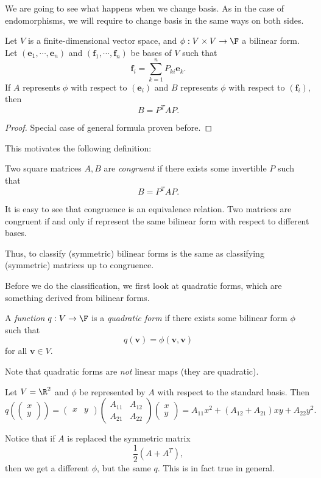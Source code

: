 \documentclass[a4paper]{article}
\begin{document}
We are going to see what happens when we change basis. As in the case of endomorphisms, we will require to change basis in the same ways on both sides.

\begin{lemma}
  Let $V$ is a finite-dimensional vector space, and $\phi: V\times V \to \F$ a bilinear form. Let $(\mathbf{e}_1, \cdots, \mathbf{e}_n)$ and $(\mathbf{f}_1, \cdots, \mathbf{f}_n)$ be bases of $V$ such that
  \[
    \mathbf{f}_i = \sum_{k = 1}^n P_{ki} \mathbf{e}_k.
  \]
  If $A$ represents $\phi$ with respect to $(\mathbf{e}_i)$ and $B$ represents $\phi$ with respect to $(\mathbf{f}_i)$, then
  \[
    B = P^T AP.
  \]
\end{lemma}

\begin{proof}
  Special case of general formula proven before.
\end{proof}

This motivates the following definition:
\begin{defi}
  Two square matrices $A, B$ are \emph{congruent} if there exists some invertible $P$ such that
  \[
    B = P^T AP.
  \]
\end{defi}
It is easy to see that congruence is an equivalence relation. Two matrices are congruent if and only if represent the same bilinear form with respect to different bases.

Thus, to classify (symmetric) bilinear forms is the same as classifying (symmetric) matrices up to congruence.

Before we do the classification, we first look at quadratic forms, which are something derived from bilinear forms.

\begin{defi}
  A \emph{function} $q: V \to \F$ is a \emph{quadratic form} if there exists some bilinear form $\phi$ such that
  \[
    q(\mathbf{v}) = \phi(\mathbf{v}, \mathbf{v})
  \]
  for all $\mathbf{v} \in V$.
\end{defi}
Note that quadratic forms are \emph{not} linear maps (they are quadratic).

\begin{eg}
  Let $V = \R^2$ and $\phi$ be represented by $A$ with respect to the standard basis. Then
  \[
    q\left(
    \begin{pmatrix}
      x\\y
    \end{pmatrix}\right) =
    \begin{pmatrix}
      x & y
    \end{pmatrix}
    \begin{pmatrix}
      A_{11} & A_{12}\\
      A_{21} & A_{22}
    \end{pmatrix}
    \begin{pmatrix}
      x\\y
    \end{pmatrix}
    = A_{11} x^2 + (A_{12} + A_{21}) xy + A_{22}y^2.
  \]
\end{eg}
Notice that if $A$ is replaced the symmetric matrix
\[
  \frac{1}{2}(A + A^T),
\]
then we get a different $\phi$, but the same $q$. This is in fact true in general.
\end{document}
